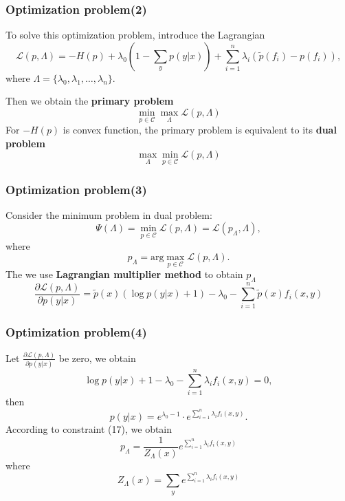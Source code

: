 \documentclass[slidestop,compress,mathserif]{beamer}
\begin{document}
	\begin{frame}
		\frametitle{Optimization problem(2)}
		To solve this optimization problem, introduce the Lagrangian
		\begin{equation}
			\mathcal{L}(p,\Lambda) = -H(p) + \lambda_0\left(1-\sum_y p(y|x) \right) + \sum_{i=1}^{n}\lambda_i\left(\widetilde{p}(f_i)-p(f_i)\right),
		\end{equation}
		where $\Lambda = \{\lambda_0,\lambda_1,\ldots,\lambda_n\}$.
		
		Then we obtain the \textbf{primary problem}
		\begin{equation}
			\min_{p\in\mathcal{C}}\max_{\Lambda}\mathcal{L}(p,\Lambda)
		\end{equation}
		For $-H(p)$ is convex function, the primary problem is equivalent to
		its \textbf{dual problem}
		\begin{equation}
			\max_{\Lambda}\min_{p\in\mathcal{C}}\mathcal{L}(p,\Lambda)
		\end{equation}
	\end{frame}
	
	\begin{frame}
		\frametitle{Optimization problem(3)}
		Consider the minimum problem in dual problem:
		\begin{equation}
			\Psi(\Lambda) = \min_{p\in\mathcal{C}}\mathcal{L}(p,\Lambda) = \mathcal{L}(p_\Lambda,\Lambda),
		\end{equation}
		where
		\begin{equation}
			p_\Lambda = \mathrm{arg}\max_{p\in\mathcal{C}}\mathcal{L}(p,\Lambda).
		\end{equation}
		The we use \textbf{Lagrangian multiplier method} to obtain $p_\Lambda$
		\begin{equation}
		\frac{\partial\mathcal{L}(p,\Lambda)}{\partial p(y|x)} 
		=\widetilde{p}(x)(\log p(y|x) +1) - \lambda_0 - \sum_{i=1}^{n}\widetilde{p}(x)f_i(x,y)
		\end{equation}
		
	\end{frame}
		
	\begin{frame}[shrink]
		\frametitle{Optimization problem(4)}
		
		Let $\frac{\partial\mathcal{L}(p,\Lambda)}{\partial p(y|x)}$ be zero, we obtain
		\begin{equation}
		\log p(y|x) +1 -\lambda_0 -\sum_{i=1}^{n}\lambda_i f_i(x,y) = 0,
		\end{equation}
		then
		\begin{equation}
		p(y|x) = e^{\lambda_0-1}\cdot e^{\sum_{i=1}^{n}\lambda_i f_i(x,y)}.
		\end{equation}
		According to constraint (17), we obtain
		\begin{equation}
		p_\Lambda = \frac{1}{Z_\Lambda(x)}e^{\sum_{i=1}^{n}\lambda_i f_i(x,y)}
		\end{equation}
		where
		\begin{equation}
		Z_\Lambda(x) = \sum_y e^{\sum_{i=1}^{n}\lambda_i f_i(x,y)}
		\end{equation}
	\end{frame}
	
\end{document}
